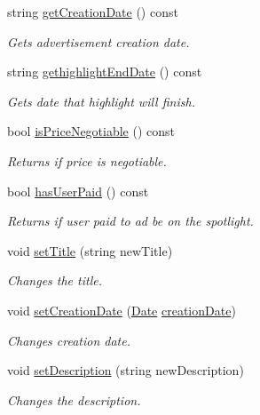 \begin{DoxyCompactItemize}
string \hyperlink{class_advertisement_aae882e292b1ddcad797df1d4b4766073}{get\+Creation\+Date} () const 
\begin{DoxyCompactList}\small\item\em Gets advertisement creation date. \end{DoxyCompactList}\item 
string \hyperlink{class_advertisement_a6fc53f531efa835c695ecd562d636be4}{gethighlight\+End\+Date} () const 
\begin{DoxyCompactList}\small\item\em Gets date that highlight will finish. \end{DoxyCompactList}\item 
bool \hyperlink{class_advertisement_a872ed609f23386fa5b26913a1d78036a}{is\+Price\+Negotiable} () const 
\begin{DoxyCompactList}\small\item\em Returns if price is negotiable. \end{DoxyCompactList}\item 
bool \hyperlink{class_advertisement_a0e277bd69072cf2250670e58bf89f491}{has\+User\+Paid} () const 
\begin{DoxyCompactList}\small\item\em Returns if user paid to ad be on the spotlight. \end{DoxyCompactList}\item 
void \hyperlink{class_advertisement_a22bc67410075fb1d7121ebe641da460e}{set\+Title} (string new\+Title)
\begin{DoxyCompactList}\small\item\em Changes the title. \end{DoxyCompactList}\item 
void \hyperlink{class_advertisement_a6313190818f1e4177bedeab6077e8fd7}{set\+Creation\+Date} (\hyperlink{class_date}{Date} \hyperlink{class_advertisement_a1997017950120c6ed305d772baae32b2}{creation\+Date})
\begin{DoxyCompactList}\small\item\em Changes creation date. \end{DoxyCompactList}\item 
void \hyperlink{class_advertisement_acaf414adece9bb3ca2077354e15ab626}{set\+Description} (string new\+Description)
\begin{DoxyCompactList}\small\item\em Changes the description. \end{DoxyCompactList}\item 

\end{DoxyCompactItemize}
